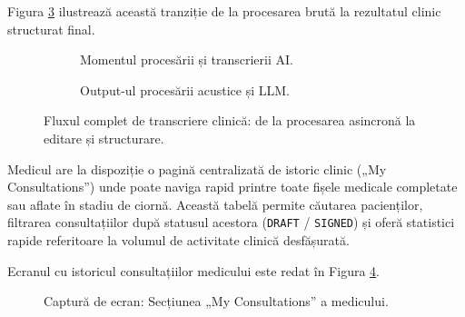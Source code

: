 Figura \ref{fig:transcription_flow} ilustrează această tranziție de la procesarea brută la rezultatul clinic structurat final.

\begin{figure}[H]
    \centering
    \begin{subfigure}[b]{0.49\textwidth}
        \centering
        \color{red}
        \caption{Momentul procesării și transcrierii AI.}
        \label{fig:screenshot_transcribing}
    \end{subfigure}
    \hfill
    \begin{subfigure}[b]{0.49\textwidth}
        \centering
        \color{red}
        \caption{Output-ul procesării acustice și LLM.}
        \label{fig:screenshot_transcription_output}
    \end{subfigure}
    \caption{Fluxul complet de transcriere clinică: de la procesarea asincronă la editare și structurare.}
    \label{fig:transcription_flow}
\end{figure}

Medicul are la dispoziție o pagină centralizată de istoric clinic („My Consultations”) unde poate naviga rapid printre toate fișele medicale completate sau aflate în stadiu de ciornă. Această tabelă permite căutarea pacienților, filtrarea consultațiilor după statusul acestora (\texttt{DRAFT} / \texttt{SIGNED}) și oferă statistici rapide referitoare la volumul de activitate clinică desfășurată.

Ecranul cu istoricul consultațiilor medicului este redat în Figura \ref{fig:screenshot_doctor_consultations}.

\begin{figure}[H]
    \centering
    \color{red}
    \caption{Captură de ecran: Secțiunea „My Consultations” a medicului.}
    \label{fig:screenshot_doctor_consultations}
\end{figure}

